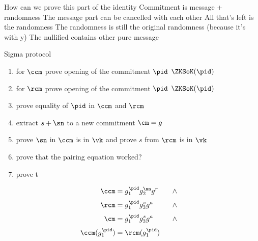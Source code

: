 How can we prove this part of the identity
Commitment is message + randomness
The message part can be cancelled with each other
All that's left is the randomness
The randomness is still the original randomness (because it's with y)
The nullified contains other pure message


\noindent Sigma protocol \\
\begin{enumerate}
    \item for $\ccm$ prove opening of the commitment $\pid$ $\ZKSoK(\pid)$ 
    \item for $\rcm$ prove opening of the commitment $\pid$ $\ZKSoK(\pid)$
    \item prove equality of $\pid$ in $\ccm$ and $\rcm$
    \item extract $s + \sn$ to a new commitment $\cm = g$
    \item prove $\sn$ in $\ccm$ is in $\vk$ and prove $s$ from $\rcm$ is in $\vk$
    \item prove that the pairing equation worked? 
    \item prove t
\end{enumerate}

\begin{equation*}
    \begin{aligned}
        \ccm &= g_1^{\pid}g_2^{\sn}g^r \quad & \wedge \quad \\[2pt]
        \rcm &= g_1^{\pid}g_3^sg^a \quad & \wedge \quad \\[2pt]
        \cm &= g_1^{\pid}g_3^sg^a \quad & \wedge \quad \\[2pt]
        \ccm(g_1^{\pid}) &= \rcm(g_1^{\pid})
    \end{aligned}
\end{equation*}


